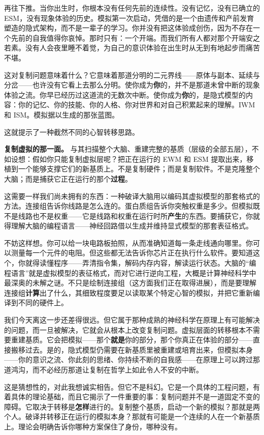 \documentclass[11pt, twoside, openright]{book}
\begin{document}
再往下推。当你出生时，你根本没有任何先前的连续性。没有记忆，没有已确立的 ESM，没有现象体验的历史。模拟第一次启动，凭借的是一个由遗传和产前发育塑造的隐式架构，而不是一辈子的学习。你并没有把这体验成创伤，因为不存在一个先前的自我值得你哀悼。那时只有：一个开端。而我们所有人都对那个开端安之若素。没有人会夜里睡不着觉，为自己的意识体验在出生时从无到有地起步而痛苦不堪。

这对复制问题意味着什么？它意味着那道分明的二元界线------原体与副本、延续与分岔------也许没有它看上去那么分明。使你成为\textbf{你}的，并不是那道未曾中断的现象体验之流。你早已经历过这道流的无数次中断。使你成为\textbf{你}的，是隐式模型的内容：你的记忆、你的技能、你的人格、你对世界和对自己积累起来的理解。IWM 和 ISM。模拟据以生成的那张蓝图。

这就提示了一种截然不同的心智转移思路。

\textbf{复制虚拟的那一面。} 与其扫描整个大脑、重建完整的基质（层级的全部五层），不如设想：假如你只能复制虚拟层呢？把正在运行的 EWM 和 ESM 提取出来，移植到一个能够支撑它们的新基质上。不是复制硬件；而是复制软件。不是克隆整个大脑；而是捕获它正在运行的那个\textbf{过程}。

这需要一样我们尚未拥有的东西：一种破译大脑用以编码其虚拟模型的那套格式的方法。连接组告诉你线路是怎么连的。蛋白质组告诉你突触权重是多少。但模拟既不是线路也不是权重------它是线路和权重在运行时所\textbf{产生}的东西。要捕获它，你就得理解大脑的编程语言------神经回路借以生成并维持显式模型的那套表征格式。

不妨这样想。你可以给一块电路板拍照，从而准确知道每一条走线通向哪里。你可以测量每一个元件的电阻。但这些都无法告诉你芯片正在执行什么软件。要知道这个，你就得读懂程序------弄清指令集，解码内存内容，解读运行状态。大脑的“编程语言”就是虚拟模型的表征格式，而对它进行逆向工程，大概是计算神经科学中最深奥的未解之谜。不只是绘制连接组（这方面我们正在取得进展），而是要理解连接组\textbf{计算}出了什么，其细致程度要足以读取某个特定心智的模拟，并把它重新编译到不同的硬件上。

我们今天离这一步还差得很远。但它属于那种成熟的神经科学在原理上有可能解决的问题，而一旦被解决，它就会从根本上改变复制问题。虚拟层面的转移根本不需要重建基质。它会把模拟------那个\textbf{就是}你的部分，那个你真正在体验的部分------直接搬移过去。是的，隐式模型仍需要在新基质里被重建或培育出来，但模拟本身------你的意识之流、你此刻的思绪、你持续不断的自我感------在原理上可以跨过那道鸿沟，而不必经历那道让复制在哲学上如此令人不安的中断。

这是猜想性的，对此我想诚实相告。但它不是科幻。它是一个具体的工程问题，有着具体的理论基础，而且它揭示了一件重要的事：复制问题并不是一道固定不变的障碍。它取决于转移是\textbf{怎样}进行的。复制整个基质，启动一个新的模拟？那就是两个人。破译并转移正在运行的模拟本身？那就有可能是一个连续的人在一个新基质上。理论会明确告诉你哪种方案保住了身份，哪种没有。
\end{document}
